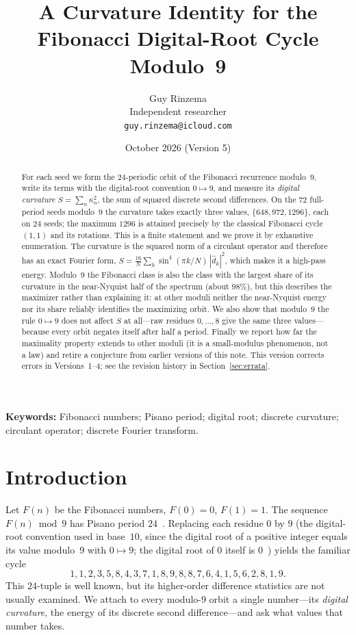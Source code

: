 \documentclass[12pt]{article}
\title{A Curvature Identity for the Fibonacci Digital-Root Cycle Modulo~9}
\author{Guy Rinzema\\
Independent researcher\\
\texttt{guy.rinzema@icloud.com}}
\date{October 2026 (Version 5)}
\theoremstyle{remark}
\begin{document}
\maketitle

\begin{abstract}
For each seed we form the $24$-periodic orbit of the Fibonacci recurrence modulo~$9$,
write its terms with the digital-root convention $0\mapsto 9$, and measure its
\emph{digital curvature} $S=\sum_n \kappa_n^2$, the sum of squared discrete second
differences. On the $72$ full-period seeds modulo~$9$ the curvature takes exactly three
values, $\{648,972,1296\}$, each on $24$ seeds; the maximum $1296$ is attained precisely by
the classical Fibonacci cycle $(1,1)$ and its rotations. This is a finite statement and we
prove it by exhaustive enumeration. The curvature is the squared norm of a circulant
operator and therefore has an exact Fourier form,
$S=\frac{16}{N}\sum_{k}\sin^4(\pi k/N)\,|\hat d_k|^2$, which makes it a high-pass energy.
Modulo~$9$ the Fibonacci class is also the class with the largest share of its curvature
in the near-Nyquist half of the spectrum (about $98\%$), but this describes the maximizer
rather than explaining it: at other moduli neither the near-Nyquist energy nor its share
reliably identifies the maximizing orbit. We also show that modulo~$9$ the rule
$0\mapsto 9$ does not affect $S$ at all---raw residues $0,\dots,8$ give the same three
values---because every orbit negates itself after half a period. Finally we report how far the maximality
property extends to other moduli (it is a small-modulus phenomenon, not a law) and retire
a conjecture from earlier versions of this note. This version corrects errors in
Versions~1--4; see the revision history in Section~\ref{sec:errata}.
\end{abstract}

\noindent\textbf{Keywords:} Fibonacci numbers; Pisano period; digital root;
discrete curvature; circulant operator; discrete Fourier transform.

\section{Introduction}

Let $F(n)$ be the Fibonacci numbers, $F(0)=0$, $F(1)=1$. The sequence $F(n)\bmod 9$ has
Pisano period $24$~\cite{Wall1960}. Replacing each residue $0$ by $9$ (the digital-root
convention used in base~$10$, since the digital root of a positive integer equals its
value modulo~$9$ with $0\mapsto 9$; the digital root of $0$ itself is $0$~\cite{OEIS})
yields the familiar cycle
\[
1,1,2,3,5,8,4,3,7,1,8,9,8,8,7,6,4,1,5,6,2,8,1,9.
\]
This $24$-tuple is well known, but its higher-order difference statistics are not usually
examined. We attach to every modulo-$9$ orbit a single number---its \emph{digital
curvature}, the energy of its discrete second difference---and ask what values that number
takes.
\end{document}
